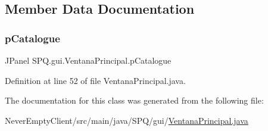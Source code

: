 \subsection{Member Data Documentation}
\mbox{\label{class_s_p_q_1_1gui_1_1_ventana_principal_a0835e35fdf5ad82ba10366336f5fbdb4}} 
\subsubsection{\texorpdfstring{p\+Catalogue}{pCatalogue}}
{\footnotesize\ttfamily J\+Panel S\+P\+Q.\+gui.\+Ventana\+Principal.\+p\+Catalogue}



Definition at line 52 of file Ventana\+Principal.\+java.



The documentation for this class was generated from the following file\+:\begin{DoxyCompactItemize}
\item 
Never\+Empty\+Client/src/main/java/\+S\+P\+Q/gui/\mbox{\hyperlink{_ventana_principal_8java}{Ventana\+Principal.\+java}}\end{DoxyCompactItemize}
